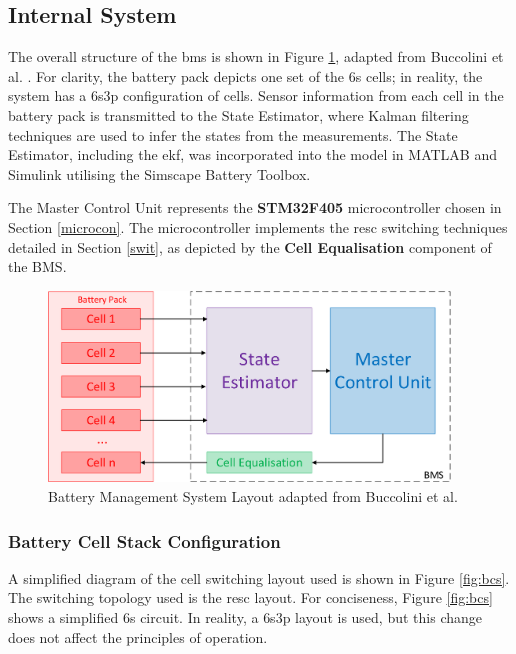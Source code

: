 \subsection{Internal System}

The overall structure of the \acrshort{bms} is shown in Figure \ref{fig:bms_layout}, adapted from Buccolini et al. \cite{7555475}. For clarity, the battery pack depicts one set of the \acrshort{6s} cells; in reality, the system has a \acrshort{6s3p} configuration of cells. Sensor information from each cell in the battery pack is transmitted to the State Estimator, where Kalman filtering techniques are used to infer the states from the measurements. The State Estimator, including the \gls{ekf}, was incorporated into the model in MATLAB and Simulink utilising the Simscape Battery Toolbox.

The Master Control Unit represents the \textbf{STM32F405} microcontroller chosen in Section \ref{microcon}. The microcontroller implements the \gls{resc} switching techniques detailed in Section \ref{swit}, as depicted by the \textbf{Cell Equalisation} component of the BMS.

\begin{figure}[H]
  \centering
  \vspace{5mm}
  \includegraphics[width=0.95\textwidth]{figs/Samuel/Figures/BMS Internal (1)-cropped.pdf}
  \caption{Battery Management System Layout adapted from Buccolini et al. \cite{7555475}}
  \label{fig:bms_layout}
\end{figure}






\subsubsection{Battery Cell Stack Configuration}

A simplified diagram of the cell switching layout used is shown in Figure \ref{fig:bcs}. The switching topology used is the \gls{resc} layout. For conciseness, Figure \ref{fig:bcs} shows a simplified \gls{6s} circuit. In reality, a \gls{6s3p} layout is used, but this change does not affect the principles of operation. 

